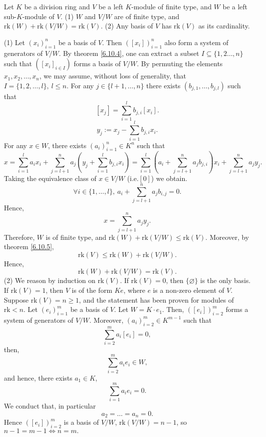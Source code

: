 \begin{theoremenv}
    Let $K$ be a division ring and $V$ be a left $K$-module of finite type, and $W$ be a left sub-$K$-module of $V$. 
    \newline
    (1) $W$ and $V/W$ are of finite type, and $\mathrm{rk}(W)+\mathrm{rk}(V/W)=\mathrm{rk}(V)$.
    \newline
    (2) Any basis of $V$ has $\mathrm{rk}(V)$ as its cardinality.
\end{theoremenv}
\begin{proofenv}
    \quad\newline
    (1) Let $\left(x_i\right)_{i=1}^n$ be a basis of $V$. Then $\left([x_i]\right)_{i=1}^n$ also form a system of generators of $V/W$. By theorem \ref{6.10.4}, one can extract a subset $I\subseteq\{1,2\dots,n\}$ such that $\left([x_i]_{i\in I}\right)$ forms a basis of $V/W$. By permuting the elements $x_1,x_2,\dots, x_n$, we may assume, without loss of generality, that $I=\{1,2,\dots,l\},\ l\le n$. For any $j\in\{l+1,\dots, n\}$ there exists $(b_{j,1},\dots,b_{j,l})$ such that 
     $$[x_j]=\sum_{i=1}^{l}b_{j,i}[x_{i}].$$
     $$y_j:=x_j-\sum_{i=1}^{l}b_{j,i}x_i.$$
     For any $x\in W$, there exists $\left(a_i\right)_{i=1}^n\in K^n$ such that 
     $$x=\sum_{i=1}^{l}a_ix_i+\sum_{j=l+1}^{n}a_j\left(y_j+\sum_{i=1}^{l}b_{j,i}x_i\right)=\sum_{i=1}^{l}\left(a_i+\sum_{j=l+1}^{n}a_jb_{j,i}\right)x_i+\sum_{j=l+1}^{n}a_jy_j.$$
     Taking the equivalence class of $x\in V/W$ (i.e.$[0]$) we obtain. 
     $$\forall i\in \{1,\dots,l\},\ a_i+\sum_{j=l+1}^{n}a_jb_{i,j}=0.$$
     Hence, 
     $$x=\sum_{j=l+1}^{n}a_jy_j.$$
     Therefore, $W$ is of finite type, and $\mathrm{rk}(W)+\mathrm{rk}(V/W)\le \mathrm{rk}(V)$. Moreover, by theorem \ref{6.10.5},
     $$\mathrm{rk}(V)\le\mathrm{rk}(W)+\mathrm{rk}(V/W).$$
     Hence, $$\mathrm{rk}(W)+\mathrm{rk}(V/W)=\mathrm{rk}(V).$$
     (2) We reason by induction on $\mathrm{rk}(V)$. If $\mathrm{rk}(V)=0$, then $\{\varnothing\}$ is the only basis. If $\mathrm{rk}(V)=1$, then $V$ is of the form $Ke$, where $e$ is a non-zero element of $V$. Suppose $\mathrm{rk}(V)=n\ge 1$, and the statement has been proven for modules of $\mathrm{rk}<n$. Let $\left(e_i\right)_{i=1}^m$ be a basis of $V$. Let $W=K\cdot e_1$. Then, $\left([e_i]\right)_{i=2}^m$ forms a system of generators of $V/W$. Moreover, $\left(a_i\right)_{i=2}^m\in K^{m-1}$ such that 
     $$\sum_{i=2}^{m}a_i[e_i]=0,$$
     then,
     $$\sum_{i=2}^{m}a_ie_i\in W,$$
     and hence, there exists $a_1\in K$,
     $$\sum_{i=1}^{m}a_ie_i=0.$$
     We conduct that, in particular
     $$a_2=\dots=a_n=0.$$
     Hence $\left([e_i]\right)_{i=2}^m$ is a basis of $V/W$, $\mathrm{rk}(V/W)=n-1$, so $n-1=m-1\Leftrightarrow n=m.$
\end{proofenv}

